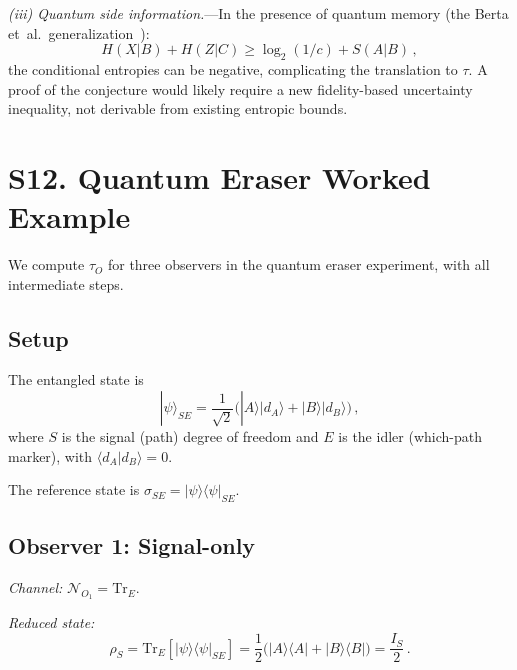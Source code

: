 \documentclass[aps,prd,preprint,superscriptaddress,longbibliography]{revtex4-2}
\newcommand{\Tr}{\mathrm{Tr}}
\newcommand{\chan}{\mathcal{N}}
\newcommand{\ket}[1]{|#1\rangle}
\newcommand{\bra}[1]{\langle#1|}
\newcommand{\braket}[2]{\langle#1|#2\rangle}
\newcommand{\op}[2]{|#1\rangle\langle#2|}
\newcommand{\tauasym}{\tau}
\begin{document}
\emph{(iii) Quantum side information.}---In the presence of quantum
memory (the Berta et~al.\ generalization~\cite{BertaEtAl2010}):
\begin{equation}
  H(X|B) + H(Z|C) \geq \log_2(1/c) + S(A|B)\,,
  \label{eq:BCC}
\end{equation}
the conditional entropies can be negative, complicating the
translation to $\tauasym$.  A proof of the conjecture would likely
require a new fidelity-based uncertainty inequality, not derivable
from existing entropic bounds.

\section{S12. Quantum Eraser Worked Example}
\label{sec:eraser}

We compute $\tauasym_O$ for three observers in the quantum eraser
experiment, with all intermediate steps.

\subsection{Setup}

The entangled state is
\begin{equation}
  \ket{\psi}_{SE} = \frac{1}{\sqrt{2}}
  \big(\ket{A}\ket{d_A} + \ket{B}\ket{d_B}\big)\,,
  \label{eq:eraser_state}
\end{equation}
where $S$ is the signal (path) degree of freedom and $E$ is the
idler (which-path marker), with $\braket{d_A}{d_B} = 0$.

The reference state is $\sigma_{SE} = \ket{\psi}\!\bra{\psi}_{SE}$.

\subsection{Observer 1: Signal-only}

\emph{Channel:} $\chan_{O_1} = \Tr_E$.

\emph{Reduced state:}
\begin{equation}
  \rho_S = \Tr_E[\ket{\psi}\!\bra{\psi}_{SE}]
  = \frac{1}{2}\big(\op{A}{A} + \op{B}{B}\big)
  = \frac{I_S}{2}\,.
  \label{eq:rho_S}
\end{equation}
\end{document}
